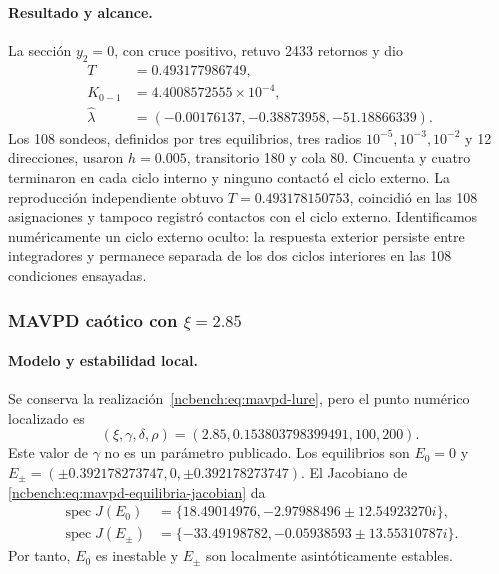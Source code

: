 \paragraph{Resultado y alcance.}
La sección \(y_2=0\), con cruce positivo, retuvo 2433 retornos y dio
\begin{equation}
 \begin{aligned}
  T&=0.493177986749,\\
  K_{0-1}&=4.4008572555\times10^{-4},\\
  \widehat\lambda&=(-0.00176137,-0.38873958,-51.18866339).
 \end{aligned}
 \label{ncbench:eq:mavpd-periodic-results}
\end{equation}
Los 108 sondeos, definidos por tres equilibrios, tres radios
\(10^{-5},10^{-3},10^{-2}\) y 12 direcciones, usaron \(h=0.005\),
transitorio 180 y cola 80. Cincuenta y cuatro terminaron en cada ciclo interno
y ninguno contactó el ciclo externo. La reproducción independiente obtuvo
\(T=0.493178150753\), coincidió en las 108 asignaciones y tampoco registró
contactos con el ciclo externo. Identificamos numéricamente un ciclo externo
oculto: la respuesta exterior persiste entre integradores y permanece
separada de los dos ciclos interiores en las 108 condiciones ensayadas.

\subsubsection{MAVPD caótico con \texorpdfstring{\(\xi=2.85\)}{xi=2.85}}

\paragraph{Modelo y estabilidad local.}
Se conserva la realización~\eqref{ncbench:eq:mavpd-lure}, pero el punto
numérico localizado es
\begin{equation}
 (\xi,\gamma,\delta,\rho)=
 (2.85,0.153803798399491,100,200).
 \label{ncbench:eq:mavpd-chaos-parameters}
\end{equation}
Este valor de \(\gamma\) no es un parámetro publicado. Los equilibrios son
\(E_0=0\) y
\(E_\pm=(\pm0.392178273747,0,\pm0.392178273747)\). El Jacobiano de
\eqref{ncbench:eq:mavpd-equilibria-jacobian} da
\begin{equation}
 \begin{aligned}
  \operatorname{spec}J(E_0)&=
  \{18.49014976,-2.97988496\pm12.54923270i\},\\
  \operatorname{spec}J(E_\pm)&=
  \{-33.49198782,-0.05938593\pm13.55310787i\}.
 \end{aligned}
 \label{ncbench:eq:mavpd-chaos-spectra}
\end{equation}
Por tanto, \(E_0\) es inestable y \(E_\pm\) son localmente asintóticamente
estables.

